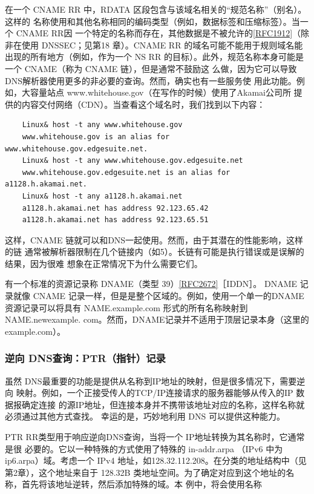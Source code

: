 在一个 CNAME RR 中，RDATA 区段包含与该域名相关的“规范名称”（别名）。这样的
名称使用和其他名称相同的编码类型（例如，数据标签和压缩标签）。当一个 CNAME RR因
一个特定的名称而存在，其他数据是不被允许的\href{https://www.rfc-editor.org/rfc/rfc1912}{[RFC1912]}（除非在使用
DNSSEC；见第18
章）。CNAME RR 的域名可能不能用于规则域名能出现的所有地方（例如，作为一个 NS RR
的目标）。此外，规范名称本身可能是一个 CNAME（称为 CNAME 链），但是通常不鼓励这
么做，因为它可以导致DNS解析器使用更多的非必要的查询。然而，确实也有一些服务使
用此功能。例如，大容量站点 www.whitehouse.gov（在写作的时候）使用了Akamai公司所
提供的内容交付网络（CDN）\footnotemark。当查看这个域名时，我们找到以下内容：

\begin{verbatim}
    Linux& host -t any www.whitehouse.gov
    www.whitehouse.gov is an alias for www.whitehouse.gov.edgesuite.net.
    Linux& host -t any www.whitehouse.gov.edgesuite.net
    www.whitehouse.gov.edgesuite.net is an alias for a1128.h.akamai.net.
    Linux& host -t any a1128.h.akamai.net
    a1128.h.akamai.net has address 92.123.65.42
    a1128.h.akamai.net has address 92.123.65.51
\end{verbatim}

这样，CNAME 链就可以和DNS一起使用。然而，由于其潜在的性能影响，这样的链
通常被解析器限制在几个链接内（如5）。长链有可能是执行错误或是误解的结果，因为很难
想象在正常情况下为什么需要它们。

\begin{tcolorbox}
  有一个标准的资源记录称 DNAME（类型
  39）\href{https://www.rfc-editor.org/rfc/rfc2672}{[RFC2672]}［IDDN］。 DNAME
  记录就像 CNAME 记录一样，但是是整个区域的。例如，使用一个单一的DNAME
  资源记录可以将具有 NAME.example.com 形式的所有名称映射到 NAME.newexample.
  com。然而，DNAME记录并不适用于顶层记录本身（这里的 example.com）。
\end{tcolorbox}

\subsubsection{逆向 DNS查询：PTR（指针）记录}

虽然 DNS最重要的功能是提供从名称到IP地址的映射，但是很多情况下，需要逆向
映射。例如，一个正接受传人的TCP/IP连接请求的服务器能够从传入的IP 数据报确定连接
的源IP地址，但连接本身并不携带该地址对应的名称，这样名称就必须通过其他方式查找。
幸运的是，巧妙地利用 DNS 可以提供这种能力。

PTR RR类型用于响应逆向DNS查询，当将一个 IP地址转换为其名称时，它通常是很
必要的。它以一种特殊的方式使用了特殊的 in-addr.arpa （IPv6 中为 ip6.arpa）域。考虑一个
IPv4 地址，如128.32.112.208。在分类的地址结构中（见第2章），这个地址来自于 128.32B
类地址空间。为了确定对应到这个地址的名称，首先将该地址逆转，然后添加特殊的域。本
例中，将会使用名称

